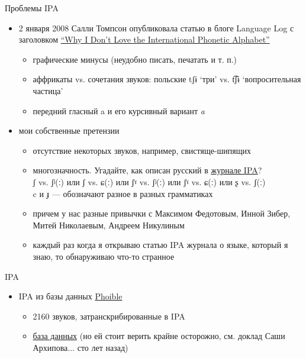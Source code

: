 \documentclass[13pt, t]{beamer}
\begin{document}
\begin{frame}{Проблемы IPA}
\begin{itemize}
\item 2 января 2008 Салли Томпсон опубликовала статью в блоге Language Log с заголовком \href{http://itre.cis.upenn.edu/~myl/languagelog/archives/005287.html}{``Why I Don't Love the International Phonetic Alphabet''}
\begin{itemize}
\item графические минусы (неудобно писать, печатать и т. п.)
\item аффрикаты vs. сочетания звуков: польские tʃɨ `три' vs. t͡ʃɨ `вопросительная частица'
\item передний гласный a \pause и его курсивный вариант \textit{a} \pause
\end{itemize}
\item мои собственные претензии
\begin{itemize}
\item отсутствие некоторых звуков, например, свистяще-шипящих
\item многозначность. Угадайте, как описан русский в \href{https://www.cambridge.org/core/services/aop-cambridge-core/content/view/55589EC639ADEF1764B5ECD0B76970FA/S0025100314000395a.pdf/russian.pdf}{журнале IPA}?\\
ʃ vs. ʃʲ(ː) или ʃ vs. ɕ(ː) или ʃˠ vs. ʃʲ(ː) или ʃˠ vs. ɕ(ː) или ʂ vs. ʃ(ː)\\
c и ɟ --- обозначают разное в разных грамматиках
\item причем у нас разные привычки с Максимом Федотовым, Инной Зибер, Митей Николаевым, Андреем Никулиным
\item каждый раз когда я открываю статью IPA журнала о языке, который я знаю, то обнаруживаю что-то странное
\end{itemize}
\end{itemize}
\end{frame}

\begin{frame}{IPA}
\begin{itemize}
\item IPA из базы данных \href{http://phoible.org/}{Phoible}
\begin{itemize}
\item 2160 звуков, затранскрибированные в IPA
\item \href{http://phoible.org/parameters/1F27FEFCD8402C09E00300258B5A7EE2#2/-3.9/75.2}{база данных} (но ей стоит верить крайне осторожно, см. доклад Саши Архипова... сто лет назад)
\end{itemize}
\end{itemize}
\end{frame}

\end{document}
